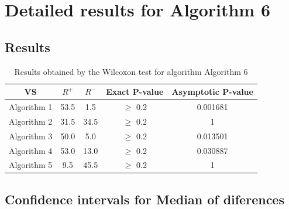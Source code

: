 \documentclass[a4paper,10pt]{article}
\begin{document}
 \clearpage 


\section{Detailed results for Algorithm 6}


\subsection{Results}

\begin{table}[!htp]
\centering\small
\begin{tabular}{
|c|c|c|c|c|}
\hline
 VS & $R^{+}$ & $R^{-}$ & Exact P-value & Asymptotic P-value \\ \hline 
Algorithm 1 & 53.5 & 1.5 & $\geq$ 0.2 & 0.001681\\ \hline 
Algorithm 2 & 31.5 & 34.5 & $\geq$ 0.2 & 1\\ \hline 
Algorithm 3 & 50.0 & 5.0 & $\geq$ 0.2 & 0.013501\\ \hline 
Algorithm 4 & 53.0 & 13.0 & $\geq$ 0.2 & 0.030887\\ \hline 
Algorithm 5 & 9.5 & 45.5 & $\geq$ 0.2 & 1\\ \hline 

\end{tabular}
\caption{Results obtained by the Wilcoxon test for algorithm Algorithm 6}
\end{table}

\subsection{Confidence intervals for Median of diferences}
\end{document}
